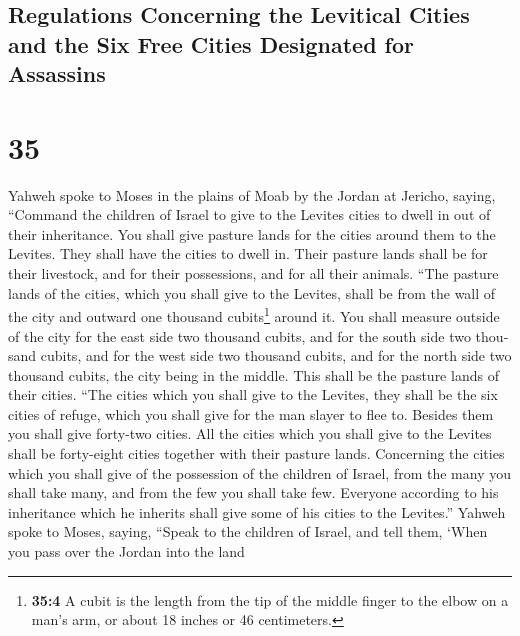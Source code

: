 \begin{paracol}{2}
\begin{otherlanguage}{english}
\hypertarget{regulations-concerning-the-levitical-cities-and-the-six-free-cities-designated-for-assassins}{%
\subsection{Regulations Concerning the Levitical Cities and the Six Free
Cities Designated for
Assassins}\label{regulations-concerning-the-levitical-cities-and-the-six-free-cities-designated-for-assassins}}

\hypertarget{section-69}{%
\section{35}\label{section-69}}

 Yahweh spoke to Moses in the plains of Moab by the Jordan
at Jericho, saying,  ``Command the children of Israel to
give to the Levites cities to dwell in out of their inheritance. You
shall give pasture lands for the cities around them to the Levites.
 They shall have the cities to dwell in. Their pasture
lands shall be for their livestock, and for their possessions, and for
all their animals.  ``The pasture lands of the cities,
which you shall give to the Levites, shall be from the wall of the city
and outward one thousand cubits\footnote{\textbf{35:4} A cubit is the
  length from the tip of the middle finger to the elbow on a man's arm,
  or about 18 inches or 46 centimeters.} around it.  You
shall measure outside of the city for the east side two thousand cubits,
and for the south side two thousand cubits, and for the west side two
thousand cubits, and for the north side two thousand cubits, the city
being in the middle. This shall be the pasture lands of their cities.
 ``The cities which you shall give to the Levites, they
shall be the six cities of refuge, which you shall give for the man
slayer to flee to. Besides them you shall give forty-two cities.
 All the cities which you shall give to the Levites shall
be forty-eight cities together with their pasture lands. 
Concerning the cities which you shall give of the possession of the
children of Israel, from the many you shall take many, and from the few
you shall take few. Everyone according to his inheritance which he
inherits shall give some of his cities to the Levites.'' 
Yahweh spoke to Moses, saying,  ``Speak to the children
of Israel, and tell them, `When you pass over the Jordan into the land

\end{otherlanguage}
\end{paracol}
